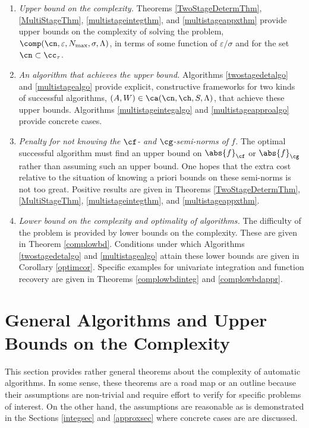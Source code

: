 \documentclass[]{elsarticle}
\theoremstyle{definition}
\theoremstyle{remark}
\newcommand{\Fnorm}[1]{\abs{#1}_{\cf}}
\newcommand{\Gnorm}[1]{\abs{#1}_{\cg}}
\begin{document}
\begin{enumerate}

\renewcommand{\labelenumi}{\roman{enumi}.}

\item \emph{Upper bound on the complexity.}
Theorems \ref{TwoStageDetermThm}, \ref{MultiStageThm}, \ref{multistageintegthm}, and \ref{multistageappxthm} provide upper bounds on the complexity of solving the problem, $\comp(\cn,\varepsilon,N_{\max},\sigma,\Lambda)$, in terms of some function of $\varepsilon/\sigma$ and for the set $\cn \subset \cc_{\tau}$.

\item \emph{An algorithm that achieves the upper bound.}  Algorithms \ref{twostagedetalgo} and \ref{multistagealgo} provide explicit, constructive frameworks for two kinds of successful algorithms, $(A,W) \in \ca(\cn,\ch,S,\Lambda)$, that achieve these upper bounds.  Algorithms \ref{multistageintegalgo} and \ref{multistageapproalgo} provide concrete cases.

\item \emph{Penalty for not knowing the $\cf$- and $\cg$-semi-norms of $f$.} The optimal successful algorithm must find an upper bound on $\Fnorm{f}$ or $\Gnorm{f}$ rather than assuming such an upper bound.  One hopes that the extra cost relative to the situation of knowing a priori bounds on these semi-norms is not too great.  Positive results are given in Theorems  \ref{TwoStageDetermThm}, \ref{MultiStageThm}, \ref{multistageintegthm}, and \ref{multistageappxthm}.

\item \emph{Lower bound on the complexity and optimality of algorithms.}  The difficulty of the problem is provided by lower bounds on the complexity.  These are given in Theorem \ref{complowbd}.  Conditions under which Algorithms \ref{twostagedetalgo} and \ref{multistagealgo} attain these lower bounds are given in Corollary \ref{optimcor}.  Specific examples for univariate integration and function recovery are given in Theorems \ref{complowbdinteg} and \ref{complowbdappr}.

\end{enumerate}

\section{General Algorithms and Upper Bounds on the Complexity} \label{genthmsec}

This section provides rather general theorems about the complexity of automatic algorithms.  In some sense, these theorems are a road map or an outline because their assumptions are non-trivial and require effort to verify for specific problems of interest.  On the other hand, the assumptions are reasonable as is demonstrated in the Sections \ref{integsec} and \ref{approxsec} where concrete cases are are discussed.  
\end{document}
